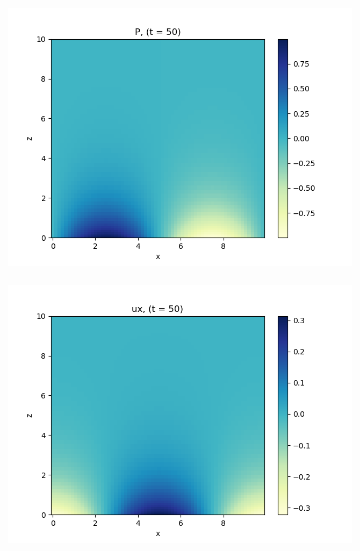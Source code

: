 \documentclass[11pt,
        usenames, %
        dvipsnames %
    ]{report}
\begin{document}
\begin{figure}[!h]
    \centering
    \begin{subfigure}{0.3\textwidth}
        \centering
        \includegraphics[width=\textwidth]{../sims_old/2d_0_no_g/no_g_P_t50.png}
    \end{subfigure}
    \begin{subfigure}{0.3\textwidth}
        \centering
        \includegraphics[width=\textwidth]{../sims_old/2d_0_no_g/no_g_ux_t50.png}
    \end{subfigure}
    \begin{subfigure}{0.3\textwidth}
        \centering

\end{subfigure}
\end{figure}
\end{document}
